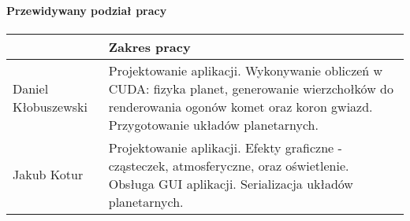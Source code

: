 \documentclass[a4paper,titlepage,10pt]{article}
\begin{document}
	\paragraph{Przewidywany podział pracy}

	\paragraph{}
	\begin{tabular}{|l|p{10cm}|}
	\hline
	~ & Zakres pracy \\\hline
	\hline
	Daniel Kłobuszewski & Projektowanie aplikacji. Wykonywanie obliczeń w CUDA: fizyka planet, generowanie wierzchołków do renderowania ogonów komet oraz koron gwiazd. Przygotowanie układów planetarnych.\\\hline
	Jakub Kotur & Projektowanie aplikacji. Efekty graficzne - cząsteczek, atmosferyczne, oraz oświetlenie. Obsługa GUI aplikacji. Serializacja układów planetarnych.\\\hline
	\end{tabular}

	\fontsize{8}{6}\selectfont
	\begin{thebibliography}{0}
	\end{thebibliography}

	\vfill
	\hspace{.6\textwidth} \makebox[.3\textwidth][l] {\hrulefill} 

	\hspace{.6\textwidth} 
\end{document}

